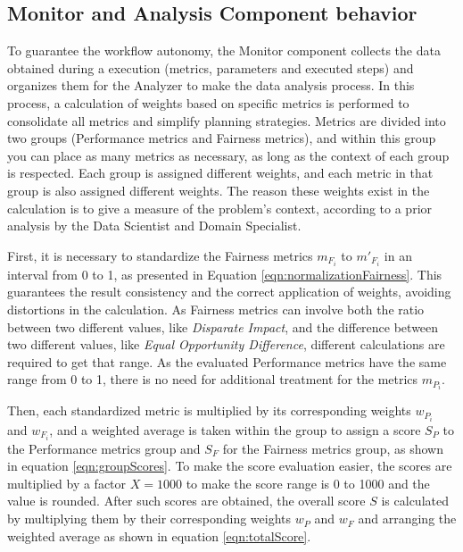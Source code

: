 \documentclass[10pt,conference]{IEEEtran}
\begin{document}
\subsection{Monitor and Analysis Component behavior}

To guarantee the workflow autonomy, the Monitor component collects the data obtained during a execution (metrics, parameters and executed steps) and organizes them for the Analyzer to make the data analysis process. In this process, a calculation of weights based on specific metrics is performed to consolidate all metrics and simplify planning strategies. Metrics are divided into two groups (Performance metrics and Fairness metrics), and within this group you can place as many metrics as necessary, as long as the context of each group is respected. Each group is assigned different weights, and each metric in that group is also assigned different weights. The reason these weights exist in the calculation is to give a measure of the problem's context, according to a prior analysis by the Data Scientist and Domain Specialist.

First, it is necessary to standardize the Fairness metrics $m_{F_i}$ to $m'_{F_i}$ in an interval from 0 to 1, as presented in Equation \ref{eqn:normalizationFairness}. This guarantees the result consistency and the correct application of weights, avoiding distortions in the calculation. As Fairness metrics can involve both the ratio between two different values, like \textit{Disparate Impact}, and the difference between two different values, like \textit{Equal Opportunity Difference}, different calculations are required to get that range. As the evaluated Performance metrics have the same range from 0 to 1, there is no need for additional treatment for the metrics $m_{P_i}$.

Then, each standardized metric is multiplied by its corresponding weights $w_{P_i}$ and $w_{F_i}$, and a weighted average is taken within the group to assign a score $S_P$ to the Performance metrics group and $S_F$ for the Fairness metrics group, as shown in equation \ref{eqn:groupScores}. To make the score evaluation easier, the scores are multiplied by a factor $X = 1000$ to make the score range is 0 to 1000 and the value is rounded. After such scores are obtained, the overall score $S$ is calculated by multiplying them by their corresponding weights $w_P$ and $w_F$ and arranging the weighted average as shown in equation \ref{eqn:totalScore}.
\end{document}
